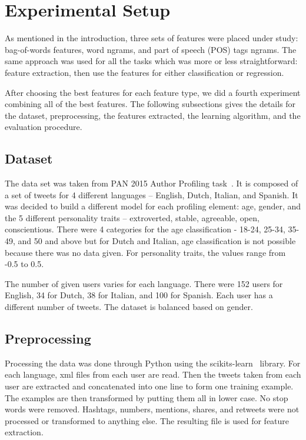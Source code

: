 \documentclass[a4paper]{llncs}
\begin{document}
\section{Experimental Setup}
As mentioned in the introduction, three sets of features  were placed under study: bag-of-words features, word ngrams, and  part of speech (POS) tags ngrams. The same approach was used for all the tasks which was more or less straightforward: feature extraction, then use the features for either classification or regression. 

After choosing the best features for each feature type, we did a fourth experiment combining all of the best features.  
The following subsections gives the details for the dataset, preprocessing, the features extracted, the learning algorithm, and the evaluation procedure. 

\subsection{Dataset}
The data set was taken from PAN 2015 Author Profiling task~\cite{rangel2015overview}. It is composed of a set of tweets for 4 different languages -- English, Dutch, Italian, and Spanish. It was decided to build a different model for each profiling element: age, gender, and the 5 different personality traits -- extroverted, stable, agreeable, open, conscientious. There were 4 categories for the age classification - 18-24, 25-34, 35-49, and 50 and above but for Dutch and Italian, age classification is not possible because there was no data given. For personality traits, the values range from -0.5 to 0.5.

The number of given users varies for each language. There were 152 users for English, 34 for Dutch, 38 for Italian, and 100 for Spanish. Each user has a different number of tweets. The dataset is balanced based on gender. 


\subsection{Preprocessing}
Processing the data was done through Python using the scikits-learn~\cite{scikit-learn} library. For each language, xml files from each user are read. Then the tweets taken from each user are extracted and concatenated into one line to form one training example. The examples are then transformed by putting them all in lower case. No stop words were removed. Hashtags, numbers, mentions, shares, and retweets were not processed or transformed to anything else. The resulting file is used for feature extraction.  
\end{document}
